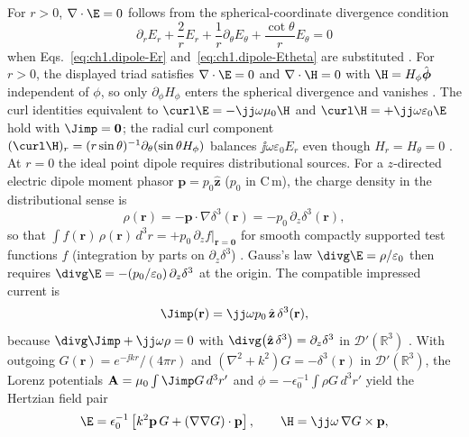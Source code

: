 For $r>0$, $\nabla\cdot\E=0$ follows from the spherical-coordinate divergence condition
\[
\partial_r E_r+\frac{2}{r}E_r+\frac{1}{r}\partial_\theta E_\theta+\frac{\cot\theta}{r}E_\theta=0
\]
when Eqs.~\eqref{eq:ch1.dipole-Er} and~\eqref{eq:ch1.dipole-Etheta} are substituted \cite{stratton1941}. For $r>0$, the displayed triad satisfies $\nabla\cdot\E=0$ and $\nabla\cdot\H=0$ with $\H=H_\phi\hat{\boldsymbol\phi}$ independent of $\phi$, so only $\partial_\phi H_\phi$ enters the spherical divergence and vanishes \cite{stratton1941,harrington2001}. The curl identities equivalent to $\curl\E=-\jj\omega\mu_0\H$ and $\curl\H=+\jj\omega\varepsilon_0\E$ hold with $\Jimp=\mathbf{0}$; the radial curl component $(\curl\H)_r=(r\sin\theta)^{-1}\partial_\theta(\sin\theta H_\phi)$ balances $\jj\omega\varepsilon_0 E_r$ even though $H_r=H_\theta=0$ \cite{stratton1941,harrington2001}. At $r=0$ the ideal point dipole requires distributional sources. For a $z$-directed electric dipole moment phasor $\mathbf{p}=p_0\hat{\mathbf{z}}$ ($p_0$ in C\,m), the charge density in the distributional sense is
\begin{equation}
\label{eq:ch1.dipole-rho-distributional}
\rho(\mathbf{r})=-\mathbf{p}\cdot\nabla\delta^{3}(\mathbf{r})
=-p_0\,\partial_z\delta^{3}(\mathbf{r}),
\end{equation}
so that $\int f(\mathbf{r})\,\rho(\mathbf{r})\,d^{3}r=+p_0\,\partial_z f|_{\mathbf{r}=\mathbf{0}}$ for smooth compactly supported test functions $f$ (integration by parts on $\partial_z\delta^{3}$) \cite{jackson1999,stratton1941}. Gauss's law $\divg\E=\rho/\varepsilon_0$ then requires $\divg\E=-(p_0/\varepsilon_0)\,\partial_z\delta^{3}$ at the origin. The compatible impressed current is
\begin{equation}
\label{eq:ch1.dipole-Jimp-distributional}
\Jimp(\mathbf{r})=\jj\omega p_0\,\hat{\mathbf{z}}\,\delta^{3}(\mathbf{r}),
\end{equation}
because $\divg\Jimp+\jj\omega\rho=0$ with $\divg\big(\hat{\mathbf{z}}\,\delta^{3}\big)=\partial_z\delta^{3}$ in $\mathcal{D}'(\mathbb{R}^{3})$ \cite{jackson1999,stratton1941}. With outgoing $G(\mathbf{r})=e^{-\jj kr}/(4\pi r)$ and $(\nabla^2+k^2)G=-\delta^{3}(\mathbf{r})$ in $\mathcal{D}'(\mathbb{R}^{3})$, the Lorenz potentials $\mathbf{A}=\mu_0\int \Jimp G\,d^{3}r'$ and $\phi=-\epsilon_0^{-1}\int\rho G\,d^{3}r'$ yield the Hertzian field pair
\begin{equation}
\label{eq:ch1.dipole-E-dyadic-distributional}
\E=\epsilon_0^{-1}\left[k^{2}\mathbf{p}\,G+(\nabla\nabla G)\cdot\mathbf{p}\right],
\qquad
\H=\jj\omega\,\nabla G\times\mathbf{p},
\end{equation}
